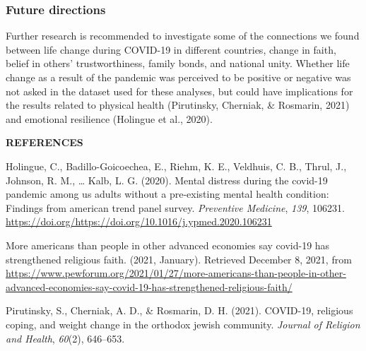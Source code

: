 \documentclass[
  english,
  man]{apa6}
\begin{document}
\hypertarget{future-directions}{%
\subsubsection{Future directions}\label{future-directions}}

Further research is recommended to investigate some of the connections we found between life change during COVID-19 in different countries, change in faith, belief in others' trustworthiness, family bonds, and national unity. Whether life change as a result of the pandemic was perceived to be positive or negative was not asked in the dataset used for these analyses, but could have implications for the results related to physical health (Pirutinsky, Cherniak, \& Rosmarin, 2021) and emotional resilience (Holingue et al., 2020).

\newpage

\textbf{REFERENCES}

\hypertarget{refs}{}
\leavevmode\hypertarget{ref-HOLINGUE2020106231}{}%
Holingue, C., Badillo-Goicoechea, E., Riehm, K. E., Veldhuis, C. B., Thrul, J., Johnson, R. M., \ldots{} Kalb, L. G. (2020). Mental distress during the covid-19 pandemic among us adults without a pre-existing mental health condition: Findings from american trend panel survey. \emph{Preventive Medicine}, \emph{139}, 106231. \url{https://doi.org/https://doi.org/10.1016/j.ypmed.2020.106231}

\leavevmode\hypertarget{ref-covid_us_faithfamily_2021}{}%
More americans than people in other advanced economies say covid-19 has strengthened religious faith. (2021, January). Retrieved December 8, 2021, from \url{https://www.pewforum.org/2021/01/27/more-americans-than-people-in-other-advanced-economies-say-covid-19-has-strengthened-religious-faith/}

\leavevmode\hypertarget{ref-pirutinsky2021covid}{}%
Pirutinsky, S., Cherniak, A. D., \& Rosmarin, D. H. (2021). COVID-19, religious coping, and weight change in the orthodox jewish community. \emph{Journal of Religion and Health}, \emph{60}(2), 646--653.
\end{document}
